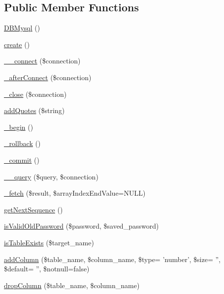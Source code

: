 \subsection*{Public Member Functions}
\begin{DoxyCompactItemize}
\item 
\hyperlink{classDBMysql_a74c9966448ca4a373407ce6f3a1d7eb0}{D\+B\+Mysql} ()
\item 
\hyperlink{classDBMysql_a58ab5c56561966d486ba54129aed954d}{create} ()
\item 
\hyperlink{classDBMysql_ad11061c47d57c2f346947e0789ecb46b}{\+\_\+\+\_\+connect} (\$connection)
\item 
\hyperlink{classDBMysql_a660e94bc5cde26859bb95cc428ca92da}{\+\_\+after\+Connect} (\$connection)
\item 
\hyperlink{classDBMysql_a59581237e4dcb5f91f63de2459248e13}{\+\_\+close} (\$connection)
\item 
\hyperlink{classDBMysql_a9674193c36272fa9ea16c20d91cfbfe5}{add\+Quotes} (\$string)
\item 
\hyperlink{classDBMysql_a7ad4bfffa35bf75ddafb93767d03a5b7}{\+\_\+begin} ()
\item 
\hyperlink{classDBMysql_a99969f9cdea111207f80faaa8a74c0ab}{\+\_\+rollback} ()
\item 
\hyperlink{classDBMysql_a3f720677af37c36b2bc2934dd358a477}{\+\_\+commit} ()
\item 
\hyperlink{classDBMysql_aa33da673a8c415b641b4e0b5209d3453}{\+\_\+\+\_\+query} (\$query, \$connection)
\item 
\hyperlink{classDBMysql_a4c7d83d8dcbb8e65c8fdfe75fa7d9fa5}{\+\_\+fetch} (\$result, \$array\+Index\+End\+Value=N\+U\+L\+L)
\item 
\hyperlink{classDBMysql_a926ea6ca10e71ae128be90604b78411f}{get\+Next\+Sequence} ()
\item 
\hyperlink{classDBMysql_a19020f1ece293bcc332400234ee95dea}{is\+Valid\+Old\+Password} (\$password, \$saved\+\_\+password)
\item 
\hyperlink{classDBMysql_a095f2a64a070958c18cb3ebfab3043e5}{is\+Table\+Exists} (\$target\+\_\+name)
\item 
\hyperlink{classDBMysql_a7d39120edb5c80f01568f404dac5c03f}{add\+Column} (\$table\+\_\+name, \$column\+\_\+name, \$type= 'number', \$size= '', \$default= '', \$notnull=false)
\item 
\hyperlink{classDBMysql_aa4cd80d663225f3cd7a539d7d7101b38}{drop\+Column} (\$table\+\_\+name, \$column\+\_\+name)
\item 

\end{DoxyCompactItemize}
